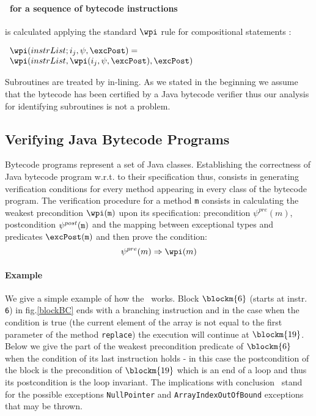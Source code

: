 \paragraph{\wpi \ for a sequence of bytecode instructions} is calculated applying the standard $\wpi$ rule for compositional statements :
\begin{center}
$ \begin{array}{l} \wpi( instrList;i_{j}, \psi,\excPost ) = \\ \wpi(instrList, \wpi(i_{j}, \psi,\excPost ),\excPost ) \end{array} $
\end{center}
Subroutines are treated by in-lining. As we stated in the beginning we assume that the bytecode has been certified by a Java
bytecode verifier thus our analysis for identifying  subroutines is not a problem.  


\subsection{Verifying Java Bytecode Programs} Bytecode programs represent a set of Java classes. Establishing the correctness of Java bytecode program w.r.t. to their specification thus, consists in generating verification conditions for every method appearing in every class of the bytecode program.
The verification procedure for a method \texttt{m} consists in  calculating the weakest precondition $\wpi(\tt{m})$ upon its specification: precondition $\psi^{pre}(m)$, 
postcondition $\psi^{post}(\tt{m})$ and the mapping between exceptional types and predicates $\excPost(\tt{m})$ and then prove the condition: 
$$
\psi^{pre}(m)  \Rightarrow \wpi(m)
$$    

\paragraph{Example} We give a simple example of how the \wpi \ works. Block $\blockm{6}$ (starts at instr. \texttt{6}) in fig.\ref{blockBC} ends with a branching instruction and in the case when the condition is true (the current element of the array is not equal to the first parameter of the method \texttt{replace}) the execution will continue at $\blockm{19}$. Below we give the part of the weakest precondition predicate of $\blockm{6}$ when the condition of its last instruction holds - in this case the postcondition of the block is the precondition of $\blockm{19}$ which is an end of a loop and thus its postcondition is the loop invariant. The implications with conclusion \Myfalse \ stand for the possible exceptions \texttt{NullPointer} and \texttt{ArrayIndexOutOfBound}  exceptions that may be thrown. 



